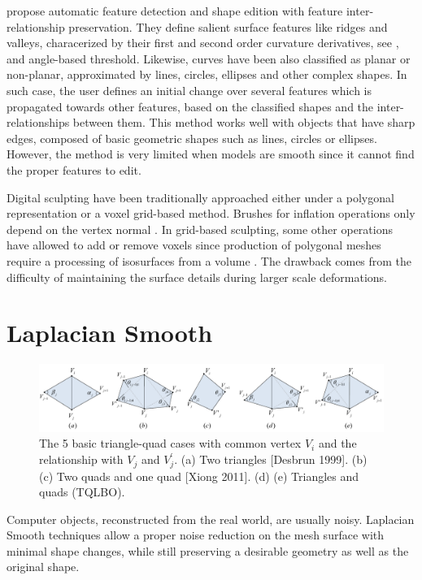 \documentclass[10pt, conference]{IEEEtran}
\begin{document}
\cite{Gal2009} propose automatic feature detection and shape edition
with feature inter-relationship preservation. They define salient
surface features like ridges and valleys, characerized by their first
and second order curvature derivatives, see \cite{Ohtake2004}, and angle-based
threshold. Likewise, curves have been also classified as planar or
non-planar, approximated by lines, circles, ellipses and other complex
shapes. In such case, the user defines an initial change over several
features which is propagated towards other features, based on the
classified shapes and the inter-relationships between them. This method
works well with objects that have sharp edges, composed of basic geometric
shapes such as lines, circles or ellipses. However, the method is
very limited when models are smooth since it cannot find the proper
features to edit.

Digital sculpting have been traditionally approached either under
a polygonal representation or a voxel grid-based method. Brushes for
inflation operations only depend on the vertex normal \cite{Stanculescu2011}.
In grid-based sculpting, some other operations have allowed to add
or remove voxels since production of polygonal meshes require a processing
of isosurfaces from a volume \cite{Galyean1991}. The drawback comes
from the difficulty of maintaining the surface details during larger
scale deformations.

\section{Laplacian Smooth\label{sec:Laplacian-Smooth}}
%
\begin{figure}[t]
\includegraphics[width=1\textwidth]{figs/beltrami}

\caption{\label{fig:LBO-basic-5-TQ}The 5 basic triangle-quad cases with common
vertex $V_{i}$ and the relationship with $V_{j}$ and $V_{j}^{\prime}$.
(a) Two triangles {[}Desbrun 1999{]}. (b) (c) Two quads and one quad
{[}Xiong 2011{]}. (d) (e) Triangles and quads (TQLBO).}
\end{figure}


Computer objects, reconstructed from the real world, are usually noisy.
Laplacian Smooth techniques allow a proper noise reduction on the
mesh surface with minimal shape changes, while still preserving a
desirable geometry as well as the original shape. 
\end{document}
